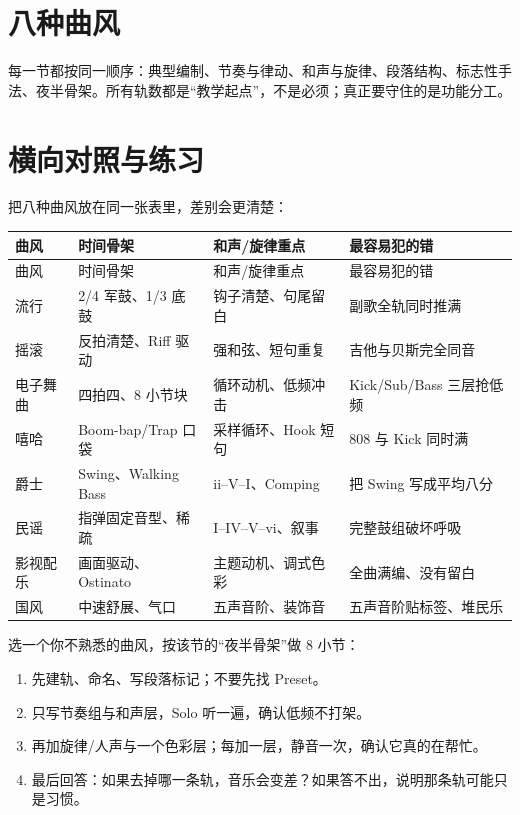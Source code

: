 \section{八种曲风}
\label{sec:genres-eight}

每一节都按同一顺序：典型编制、节奏与律动、和声与旋律、段落结构、标志性手法、夜半骨架。所有轨数都是“教学起点”，不是必须；真正要守住的是功能分工。


\section{横向对照与练习}
\label{sec:genres-compare}

把八种曲风放在同一张表里，差别会更清楚：

\begin{longtable}{p{}p{}p{}p{}}
\toprule
曲风 & 时间骨架 & 和声/旋律重点 & 最容易犯的错 \\
\midrule
\endfirsthead
\toprule
曲风 & 时间骨架 & 和声/旋律重点 & 最容易犯的错 \\
\midrule
\endhead
流行 & 2/4 军鼓、1/3 底鼓 & 钩子清楚、句尾留白 & 副歌全轨同时推满 \\
摇滚 & 反拍清楚、Riff 驱动 & 强和弦、短句重复 & 吉他与贝斯完全同音 \\
电子舞曲 & 四拍四、8 小节块 & 循环动机、低频冲击 & Kick/Sub/Bass 三层抢低频 \\
嘻哈 & Boom-bap/Trap 口袋 & 采样循环、Hook 短句 & 808 与 Kick 同时满 \\
爵士 & Swing、Walking Bass & ii–V–I、Comping & 把 Swing 写成平均八分 \\
民谣 & 指弹固定音型、稀疏 & I–IV–V–vi、叙事 & 完整鼓组破坏呼吸 \\
影视配乐 & 画面驱动、Ostinato & 主题动机、调式色彩 & 全曲满编、没有留白 \\
国风 & 中速舒展、气口 & 五声音阶、装饰音 & 五声音阶贴标签、堆民乐 \\
\bottomrule
\end{longtable}

\begin{exercise}
选一个你不熟悉的曲风，按该节的“夜半骨架”做 8 小节：
\begin{enumerate}
\item 先建轨、命名、写段落标记；不要先找 Preset。
\item 只写节奏组与和声层，Solo 听一遍，确认低频不打架。
\item 再加旋律/人声与一个色彩层；每加一层，静音一次，确认它真的在帮忙。
\item 最后回答：如果去掉哪一条轨，音乐会变差？如果答不出，说明那条轨可能只是习惯。
\end{enumerate}
\end{exercise}


